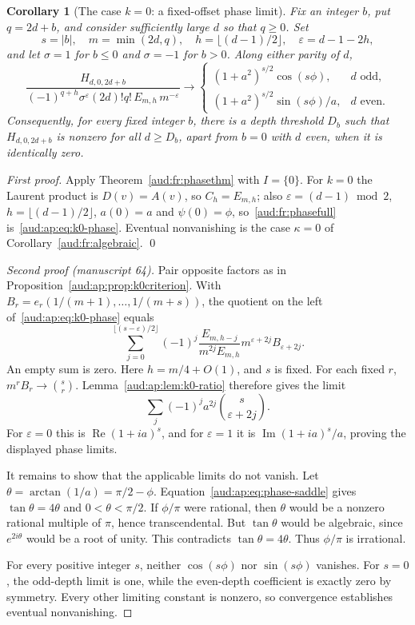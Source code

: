 \documentclass[11pt,a4paper]{article}
\numberwithin{equation}{section}
\newtheorem{corollary}[theorem]{Corollary}
\begin{document}
\begin{corollary}[The case $k=0$: a fixed-offset phase limit]\label{aud:ap:thm:k0-phase}
Fix an integer $b$, put $q=2d+b$, and consider sufficiently large $d$ so that $q\ge0$. Set
\[
 s=|b|,\quad m=\min(2d,q),\quad
 h=\lfloor(d-1)/2\rfloor,\quad\varepsilon=d-1-2h,
\]
and let $\sigma=1$ for $b\le0$ and $\sigma=-1$ for $b>0$. Along either parity of $d$,
\begin{equation}\label{aud:ap:eq:k0-phase}
 \frac{H_{d,0,2d+b}}
 {(-1)^{q+h}\sigma^\varepsilon(2d)!q!\,E_{m,h}\,m^{-\varepsilon}}
 \longrightarrow
 \begin{cases}
 (1+a^2)^{s/2}\cos(s\phi),&d\text{ odd},\\
 (1+a^2)^{s/2}\sin(s\phi)/a,&d\text{ even}.
 \end{cases}
\end{equation}
Consequently, for every fixed integer $b$, there is a depth threshold $D_b$ such that $H_{d,0,2d+b}$ is nonzero for all $d\ge D_b$, apart from $b=0$ with $d$ even, when it is identically zero.
\end{corollary}
\emph{First proof.} Apply Theorem~\ref{aud:fr:phasethm} with $I=\{0\}$. For $k=0$ the Laurent product is $D(v)=A(v)$, so $C_h=E_{m,h}$; also $\varepsilon=(d-1)\bmod2$, $h=\lfloor(d-1)/2\rfloor$, $a(0)=a$ and $\psi(0)=\phi$, so~\eqref{aud:fr:phasefull} is~\eqref{aud:ap:eq:k0-phase}. Eventual nonvanishing is the case $\kappa=0$ of Corollary~\ref{aud:fr:algebraic}. \qed

\begin{proof}[Second proof (manuscript 64)]
Pair opposite factors as in Proposition~\ref{aud:ap:prop:k0criterion}. With
$B_r=e_r(1/(m+1),\ldots,1/(m+s))$, the quotient on the left of~\eqref{aud:ap:eq:k0-phase} equals
\[
 \sum_{j=0}^{\lfloor(s-\varepsilon)/2\rfloor}
 (-1)^j\frac{E_{m,h-j}}{m^{2j}E_{m,h}}
       m^{\varepsilon+2j}B_{\varepsilon+2j}.
\]
An empty sum is zero. Here $h=m/4+O(1)$, and $s$ is fixed. For each fixed $r$, $m^rB_r\to\binom sr$. Lemma~\ref{aud:ap:lem:k0-ratio} therefore gives the limit
\[
 \sum_j(-1)^ja^{2j}\binom{s}{\varepsilon+2j}.
\]
For $\varepsilon=0$ this is $\operatorname{Re}(1+ia)^s$, and for $\varepsilon=1$ it is $\operatorname{Im}(1+ia)^s/a$, proving the displayed phase limits.

It remains to show that the applicable limits do not vanish. Let
$\theta=\arctan(1/a)=\pi/2-\phi$. Equation~\eqref{aud:ap:eq:phase-saddle} gives
$\tan\theta=4\theta$ and $0<\theta<\pi/2$. If $\phi/\pi$ were rational, then $\theta$ would be a nonzero rational multiple of $\pi$, hence transcendental. But $\tan\theta$ would be algebraic, since $e^{2i\theta}$ would be a root of unity. This contradicts $\tan\theta=4\theta$. Thus $\phi/\pi$ is irrational.

For every positive integer $s$, neither $\cos(s\phi)$ nor $\sin(s\phi)$ vanishes. For $s=0$, the odd-depth limit is one, while the even-depth coefficient is exactly zero by symmetry. Every other limiting constant is nonzero, so convergence establishes eventual nonvanishing.
\end{proof}
\end{document}
